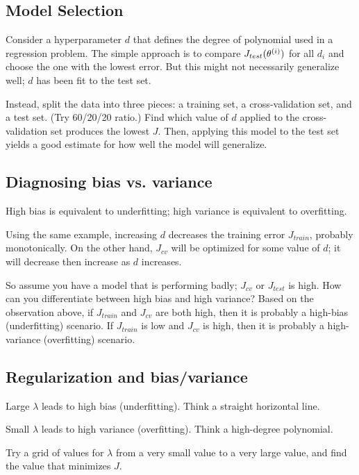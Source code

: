 \subsection{Model Selection}

Consider a hyperparameter $d$ that defines the degree of polynomial used in a regression problem.
The simple approach is to compare $J_{test}(\theta_{}^{(i)})$ for all $d_i$ and choose the one with the lowest error.
But this might not necessarily generalize well; $d$ has been fit to the test set.

Instead, split the data into three pieces: a training set, a cross-validation set, and a test set.
(Try 60/20/20 ratio.)
Find which value of $d$ applied to the cross-validation set produces the lowest $J$.
Then, applying this model to the test set yields a good estimate for how well the model will generalize.

\subsection{Diagnosing bias vs. variance}

High bias is equivalent to underfitting; high variance is equivalent to overfitting.

Using the same example, increasing $d$ decreases the training error $J_{train}$, probably monotonically.
On the other hand, $J_{cv}$ will be optimized for some value of $d$;
it will decrease then increase as $d$ increases.

So assume you have a model that is performing badly; $J_{cv}$ or $J_{test}$ is high.
How can you differentiate between high bias and high variance?
Based on the observation above, 
if $J_{train}$ and $J_{cv}$ are both high, then it is probably a high-bias (underfitting) scenario.
If $J_{train}$ is low and $J_{cv}$ is high, then it is probably a high-variance (overfitting) scenario.

\subsection{Regularization and bias/variance}

Large $\lambda$ leads to high bias (underfitting).
Think a straight horizontal line.

Small $\lambda$ leads to high variance (overfitting).
Think a high-degree polynomial.

Try a grid of values for $\lambda$ from a very small value to a very large value,
and find the value that minimizes $J$.

